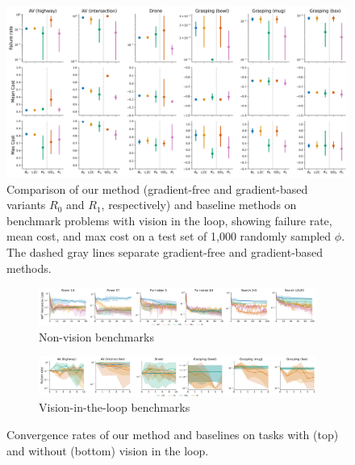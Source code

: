 \begin{figure}[tb]
    \centering
    \includegraphics[width=\linewidth]{images/corl/vision.png}
    \caption{Comparison of our method (gradient-free and gradient-based variants $R_0$ and $R_1$, respectively) and baseline methods on benchmark problems with vision in the loop, showing failure rate, mean cost, and max cost on a test set of 1,000 randomly sampled $\phi$. The dashed gray lines separate gradient-free and gradient-based methods.}\label{ch:corl:fig:vision_results}
\end{figure}

\begin{figure}[tb]
    \centering
    \begin{subfigure}[t]{\linewidth}
        \centering
        \includegraphics[width=\linewidth]{images/corl/nonvision_convergence.png}
        \caption{Non-vision benchmarks}\label{ch:corl:fig:convergence:nonvision}
    \end{subfigure}
    \begin{subfigure}[t]{\linewidth}
        \centering
        \includegraphics[width=\linewidth]{images/corl/vision_convergence.png}
        \caption{Vision-in-the-loop benchmarks}\label{ch:corl:fig:convergence:vision}
    \end{subfigure}
    \caption{Convergence rates of our method and baselines on tasks with (top) and without (bottom) vision in the loop.}\label{ch:corl:fig:convergence}
\end{figure}

